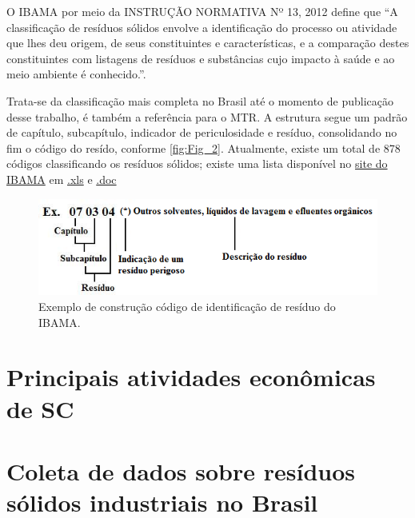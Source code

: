O \gls{IBAMA} por meio da INSTRUÇÃO NORMATIVA Nº 13, 2012 \cite{noauthor_instrucao_ibama} define que “A classificação de resíduos sólidos envolve a identificação do processo ou atividade que lhes deu origem, de seus constituintes e características, e a comparação destes constituintes com listagens de resíduos e substâncias cujo impacto à saúde e ao meio ambiente é conhecido.”.

Trata-se da classificação mais completa no Brasil até o momento de publicação desse trabalho, é também a referência para o \gls{MTR}. A estrutura segue um padrão de capítulo, subcapítulo, indicador de periculosidade e resíduo, consolidando no fim o código do resído, conforme \autoref{fig:Fig_2}. Atualmente, existe um total de 878 códigos classificando os resíduos sólidos; existe uma lista disponível no \href{https://www.gov.br/ibama/pt-br/assuntos/emissoes-e-residuos/residuos/arquivos?b_start:int=0}{site do IBAMA} em \href{https://www.gov.br/ibama/pt-br/assuntos/emissoes-e-residuos/residuos/arquivos/ibama-lista-brasileira-de-residuos-solidos.xls/view}{.xls} e \href{https://www.gov.br/ibama/pt-br/assuntos/emissoes-e-residuos/residuos/arquivos/ibama-lista-brasileira-de-residuos-solidos.doc/view}{.doc}

\begin{figure}[h]
	\caption{\label{fig:Fig_2} Exemplo de construção código de identificação de resíduo do IBAMA.}
	\begin{center}
		\includegraphics[scale=0.8]{images/exemplo-codigo-ibama.png}
	\end{center}
\end{figure}


\section{Principais atividades econômicas de SC}

\section{Coleta de dados sobre resíduos sólidos industriais no Brasil}

